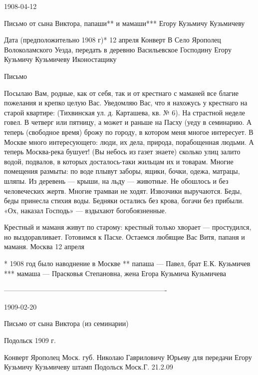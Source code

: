 1908-04-12

Письмо от сына Виктора, папаши** и мамаши*** Егору Кузьмичу Кузьмичеву

Дата (предположительно 1908 г)* 12 апреля
Конверт
В Село Ярополец Волоколамского Уезда, передать в деревню Васильевское
Господину Егору Кузьмичу Кузьмичеву
Иконостащику

Письмо

Посылаю Вам, родные, как от себя, так и от крестнаго с маманей все благие пожелания и крепко целую Вас.
Уведомляю Вас, что я нахожусь у крестнаго на старой квартире: (Тихвинская ул. д. Карташева, кв. № 6). На страстной неделе говел. В четверг или пятницу, а может и раньше на  Пасху (уеду в семинарию. 
А теперь (свободное время) брожу по городу, в котором меня многое интересует. В Москве много интересующего: люди, их дела, природа, порабощенная людьми. А теперь Москва-река бушует! (Вы небось из газет знаете) сколько улиц залито водой, подвалов, в которых  досталось-таки жильцам их и товарам. Многие помещения размыты: по воде плывут заборы, ящики, бочки, одежа, матрацы, шляпы. Из деревень — крыши, на льду — животные. Не обошлось и без человеческих жертв. 
Многие трамваи не ходят. Извозчики выручаются. 
Беды, беды принесла стихия воды. Бедняки остались без крова, богачи без прибыли. 
«Ох, наказал Господь» — вздыхают богобоязненные.

Крестный и маманя живут по старому: крестный только хворает — простудился, но выздоравливает. Готовимся к Пасхе. 
Остаемся любящие Вас Витя, папаня и маманя.
Москва 12 апреля 



* 1908 год было наводнение в Москве
** папаша — Павел, брат Е.К. Кузьмичев
*** мамаша — Прасковья Степановна, жена Егора Кузьмича Кузьмичева

----------------------------------------------------------------------


1909-02-20

Письмо от сына Виктора (из семинарии)

Подольск 1909 г. 

Конверт
Ярополец  Моск. губ.
Николаю Гавриловичу Юрьеву
для передачи Егору Кузьмичу Кузьмичеву
штамп Подольск Моск.Г. 21.2.09


